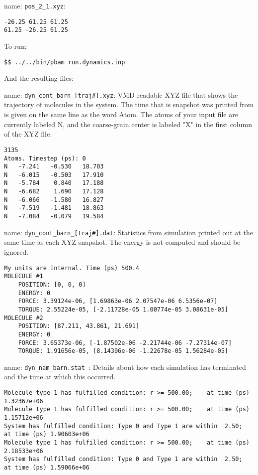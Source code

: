 \medskip

name:  \texttt{pos\_2\_1.xyz}:
\begin{lstlisting}[style = MyBash]
-26.25 61.25 61.25
61.25 -26.25 61.25
\end{lstlisting}
\medskip

To run: 
\begin{lstlisting}[style = MyBash]
$$ ../../bin/pbam run.dynamics.inp
\end{lstlisting}
\medskip

And the resulting files: 

name: \texttt{dyn\_cont\_barn\_[traj\#].xyz}: VMD readable XYZ file that shows the trajectory of molecules in the system. The time that is snapshot was printed from is given on the same line as the word Atom. The atoms of your input file are currently labeled N, and the coarse-grain center is labeled "X" in the first column of the XYZ file.

\begin{lstlisting}[style = MyBash]
3135
Atoms. Timestep (ps): 0
N   -7.241   -0.530   18.703
N   -6.015   -0.503   17.910
N   -5.784    0.840   17.188
N   -6.682    1.690   17.128
N   -6.066   -1.580   16.827
N   -7.519   -1.481   18.863
N   -7.084   -0.079   19.584
\end{lstlisting}
\medskip

name: \texttt{dyn\_cont\_barn\_[traj\#].dat}: Statistics from simulation printed out at the same time as each XYZ snapshot. The energy is not computed and should be ignored.

\begin{lstlisting}[style = MyBash]
My units are Internal. Time (ps) 500.4
MOLECULE #1
	POSITION: [0, 0, 0]
	ENERGY: 0
	FORCE: 3.39124e-06, [1.69863e-06 2.07547e-06 6.5356e-07]
	TORQUE: 2.55224e-05, [-2.11728e-05 1.00774e-05 3.08631e-05]
MOLECULE #2
	POSITION: [87.211, 43.861, 21.691]
	ENERGY: 0
	FORCE: 3.65373e-06, [-1.87502e-06 -2.21744e-06 -7.27314e-07]
	TORQUE: 1.91656e-05, [8.14396e-06 -1.22678e-05 1.56284e-05]
\end{lstlisting}
\medskip

name: \texttt{dyn\_nam\_barn.stat }: Details about how each simulation has terminated and the time at which this occurred.
\begin{lstlisting}[style = MyBash]
Molecule type 1 has fulfilled condition: r >= 500.00;	 at time (ps) 1.32367e+06
Molecule type 1 has fulfilled condition: r >= 500.00;	 at time (ps) 1.15712e+06
System has fulfilled condition: Type 0 and Type 1 are within  2.50;	 at time (ps) 1.90603e+06
Molecule type 1 has fulfilled condition: r >= 500.00;	 at time (ps) 2.18533e+06
System has fulfilled condition: Type 0 and Type 1 are within  2.50;	 at time (ps) 1.59066e+06
\end{lstlisting}


